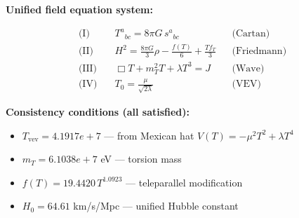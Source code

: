 
\textbf{Unified field equation system:}

\begin{align}
  \text{(I)} \quad & T^a{}_{bc} = 8\pi G \, s^a{}_{bc} && \text{(Cartan)} \\
  \text{(II)} \quad & H^2 = \frac{8\pi G}{3}\rho - \frac{f(T)}{6} + \frac{Tf_T}{3} && \text{(Friedmann)} \\
  \text{(III)} \quad & \Box T + m_T^2 T + \lambda T^3 = J && \text{(Wave)} \\
  \text{(IV)} \quad & T_0 = \frac{\mu}{\sqrt{2\lambda}} && \text{(VEV)}
\end{align}

\textbf{Consistency conditions (all satisfied):}
\begin{itemize}
  \item $T_{\text{vev}} = 4.1917e+7$ — from Mexican hat $V(T) = -\mu^2 T^2 + \lambda T^4$
  \item $m_T = 6.1038e+7$ eV — torsion mass
  \item $f(T) = 19.4420 \, T^{1.0923}$ — teleparallel modification
  \item $H_0 = 64.61$ km/s/Mpc — unified Hubble constant
\end{itemize}